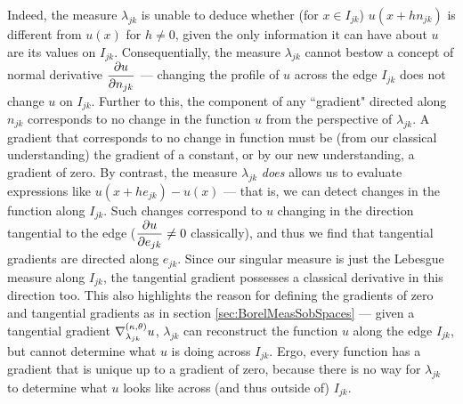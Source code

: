 Indeed, the measure $\lambda_{jk}$ is unable to deduce whether (for $x\in I_{jk}$) $u(x+hn_{jk})$ is different from $u(x)$ for $h\neq0$, given the only information it can have about $u$ are its values on $I_{jk}$.
Consequentially, the measure $\lambda_{jk}$ cannot bestow a concept of normal derivative $\dfrac{\partial u}{\partial n_{jk}}$ --- changing the profile of $u$ across the edge $I_{jk}$ does not change $u$ on $I_{jk}$.
Further to this, the component of any ``gradient" directed along $n_{jk}$ corresponds to no change in the function $u$ from the perspective of $\lambda_{jk}$.
A gradient that corresponds to no change in function must be (from our classical understanding) the gradient of a constant, or by our new understanding, a gradient of zero.
By contrast, the measure $\lambda_{jk}$ \emph{does} allows us to evaluate expressions like $u(x+he_{jk})-u(x)$ --- that is, we can detect changes in the function along $I_{jk}$.
Such changes correspond to $u$ changing in the direction tangential to the edge ($\dfrac{\partial u}{\partial e_{jk}}\neq 0$ classically), and thus we find that tangential gradients are directed along $e_{jk}$.
Since our singular measure is just the Lebesgue measure along $I_{jk}$, the tangential gradient possesses a classical derivative in this direction too.
This also highlights the reason for defining the gradients of zero and tangential gradients as in section \ref{sec:BorelMeasSobSpaces} --- given a tangential gradient $\nabla^{\left( \kappa, \theta \right)}_{\lambda_{jk}}u$, $\lambda_{jk}$ can reconstruct the function $u$ along the edge $I_{jk}$, but cannot determine what $u$ is doing across $I_{jk}$.
Ergo, every function has a gradient that is unique up to a gradient of zero, because there is no way for $\lambda_{jk}$ to determine what $u$ looks like across (and thus outside of) $I_{jk}$.

